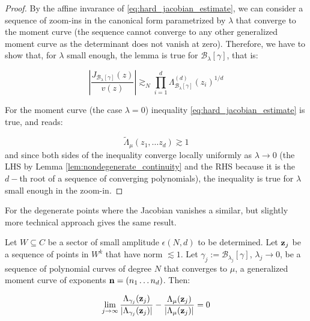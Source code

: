 	\begin{proof}
		By the affine invarance of \eqref{eq:hard_jacobian_estimate}, we can consider a sequence of zoom-ins in the canonical form parametrized by $\lambda$ that converge to the moment curve (the sequence cannot converge to any other generalized moment curve as the determinant does not vanish at zero). Therefore, we have to show that, for $\lambda$ small enough, the lemma is true for $\mathcal B_\lambda[\gamma]$, that is:

		\begin{equation}
			\left|\frac{J_{\mathcal B_\lambda[\gamma]}(z)}{v(z)}\right|\gtrsim_N \prod_{i=1}^d \Lambda^{(d)}_{\mathcal B_\lambda[\gamma]}(z_i)^{1/d}
		\end{equation}

		For the moment curve (the case $\lambda=0$) inequality \eqref{eq:hard_jacobian_estimate} is true, and reads:

		\begin{equation}
			\tilde \Lambda_{\mu}(z_1, \dots z_d) \gtrsim 1
		\end{equation}
		and since both sides of the inequality converge locally uniformly as $\lambda \to 0$ (the LHS by Lemma \ref{lem:nondegenerate_continuity} and the RHS because it is the $d-$th root of a sequence of converging polynomials), the inequality is true for $\lambda$ small enough in the zoom-in.
	\end{proof}

	For the degenerate points where the Jacobian vanishes a similar, but slightly more technical approach gives the same result.

	\begin{lemma}
		\label{lem:degenerate_convergence}
		Let $W \subseteq C$ be a sector of small amplitude $\epsilon(N,d)$ to be determined. Let ${\bf z}_j$ be a sequence of points in $W^k$ that have norm $\lesssim 1$. Let $\gamma_j:=\mathcal B_{\lambda_j}[\gamma]$, $\lambda_j \to 0$, be a sequence of polynomial curves of degree $N$ that converges to $\mu$, a generalized moment curve of exponents ${\bf n}=(n_1\dots n_d)$. Then:

		\begin{equation}
			\lim_{j\to \infty} \frac{\Lambda_{\gamma_j}({\bf z}_j)}
			{|\Lambda_{\gamma_j}({\bf z}_j)|}-\frac{\Lambda_{\mu}({\bf z}_j)}
			{|\Lambda_{\mu}({\bf z}_j)|} = 0
		\end{equation}
	\end{lemma}


